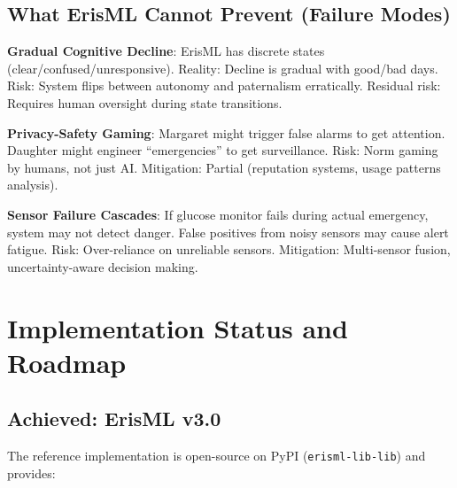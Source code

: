 \documentclass[conference]{IEEEtran}
\begin{document}
\subsection{What ErisML Cannot Prevent (Failure Modes)}

\textbf{Gradual Cognitive Decline}: ErisML has discrete states
(clear/confused/unresponsive). Reality: Decline is gradual with
good/bad days. Risk: System flips between autonomy and paternalism
erratically. Residual risk: Requires human oversight during state
transitions.

\textbf{Privacy-Safety Gaming}: Margaret might trigger false alarms to
get attention. Daughter might engineer ``emergencies'' to get
surveillance. Risk: Norm gaming by humans, not just AI. Mitigation:
Partial (reputation systems, usage patterns analysis).

\textbf{Sensor Failure Cascades}: If glucose monitor fails during
actual emergency, system may not detect danger. False positives from
noisy sensors may cause alert fatigue. Risk: Over-reliance on
unreliable sensors. Mitigation: Multi-sensor fusion, uncertainty-aware
decision making.

\section{Implementation Status and Roadmap}
\label{sec:roadmap}

\subsection{Achieved: ErisML v3.0}

The reference implementation is open-source on PyPI (\texttt{erisml-lib-lib}) and provides:
\end{document}
